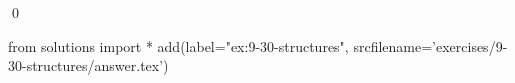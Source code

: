 
\begin{ex}
  \label{ex:9-30-structures}
  
  \qed
\end{ex}
\begin{python0}
from solutions import *
add(label="ex:9-30-structures",
    srcfilename='exercises/9-30-structures/answer.tex')
\end{python0}
